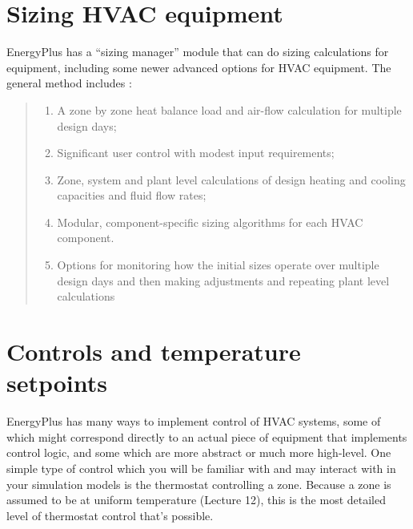 \documentclass[10pt]{article}
\begin{document}


\section{Sizing HVAC equipment}

EnergyPlus has a ``sizing manager'' module that can do sizing calculations for equipment, including some newer advanced options for HVAC equipment. The general method includes \cite{EPdocs9engineering}:

\begin{quote}
\begin{enumerate}
    \item A zone by zone heat balance load and air-flow calculation for multiple design days;
    \item Significant user control with modest input requirements;
    \item Zone, system and plant level calculations of design heating and cooling capacities and fluid
flow rates;
\item Modular, component-specific sizing algorithms for each HVAC component.
\item Options for monitoring how the initial sizes operate over multiple design days and then making
adjustments and repeating plant level calculations
\end{enumerate}
\end{quote}

\section{Controls and temperature setpoints}

EnergyPlus has many ways to implement control of HVAC systems, some of which might correspond directly to an actual piece of equipment that implements control logic, and some which are more abstract or much more high-level. One simple type of control which you will be familiar with and may interact with in your simulation models is the thermostat controlling a zone. Because a zone is assumed to be at uniform temperature (Lecture 12), this is the most detailed level of thermostat control that's possible. 
\end{document}
